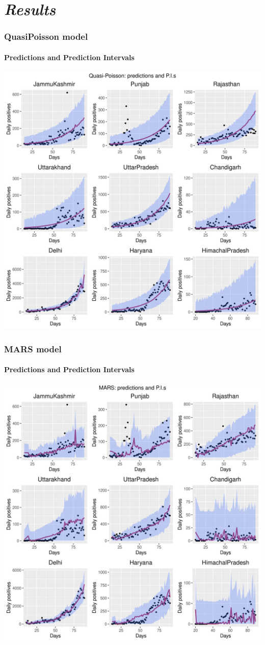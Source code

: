 \documentclass{beamer}
\begin{document}
\section{\textit{Results}}{
	\begin{frame}
		\frametitle{QuasiPoisson model}
		\framesubtitle{Predictions and Prediction Intervals}
		\center \includegraphics[scale = 0.37]{qp_ppi.png}
	\end{frame}
	\begin{frame}
		\frametitle{MARS model}
		\framesubtitle{Predictions and Prediction Intervals}
		\center \includegraphics[scale = 0.37]{mars_ppi.png}

\end{frame}}
\end{document}
